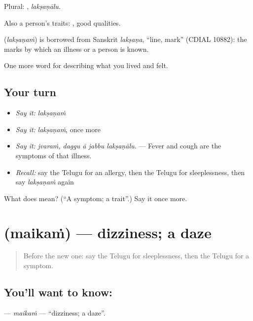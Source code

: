 Plural: , \emph{lakṣaṇālu}.

Also a person's traits:  , good qualities.

\begin{cousinweb}
\textbf{} (\emph{lakṣaṇaṁ}) is borrowed from Sanskrit \emph{lakṣaṇa}, \textquotedblleft{}line, mark\textquotedblright{} (CDIAL 10882): the marks by which an illness or a person is known.
\end{cousinweb}

\begin{grammarlens}[title={What you've built}]
One more word for describing what you lived and felt.
\end{grammarlens}

\subsection*{Your turn}
\begin{itemize}
\raggedright
  \item \emph{Say it:} \emph{lakṣaṇaṁ}
  \item \emph{Say it:} \emph{lakṣaṇaṁ}, once more
  \item \emph{Say it:} \emph{jvaraṁ, daggu ā jabbu lakṣaṇālu.} — Fever and cough are the symptoms of that illness.
  \item \emph{Recall:} say the Telugu for an allergy, then the Telugu for sleeplessness, then say \emph{lakṣaṇaṁ} again
\end{itemize}

\begin{tcolorbox}[breakable,colback=teal!4,colframe=teal!35!black,title={Before you move on}]
What does  mean? (\textquotedblleft{}A symptom; a trait\textquotedblright{}.) Say it once more.
\end{tcolorbox}
\section[\texorpdfstring{\te{మైకం} (maikaṁ)}{మైకం (maikaṁ)}]{ (maikaṁ) — dizziness; a daze}

\label{lesson:TE-C517-maikam}



\begin{quote}
Before the new one: say the Telugu for sleeplessness, then the Telugu for a symptom.
\end{quote}

\subsection*{You'll want to know: }
\textbf{} — \emph{maikaṁ} — \textquotedblleft{}dizziness; a daze\textquotedblright{}.


